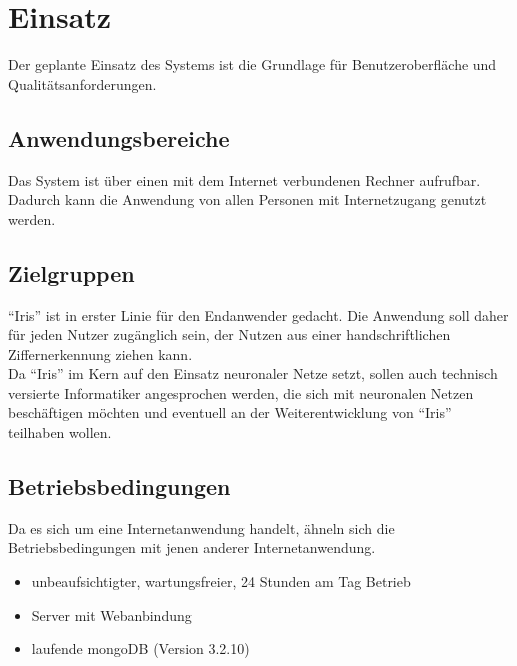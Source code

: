 \section{Einsatz}
Der geplante Einsatz des Systems ist die Grundlage für Benutzeroberfläche und
Qualitätsanforderungen.
 
\subsection{Anwendungsbereiche}

Das System ist über einen mit dem Internet verbundenen Rechner aufrufbar. Dadurch kann die Anwendung von allen Personen mit Internetzugang genutzt werden.

\subsection{Zielgruppen}

``Iris'' ist in erster Linie für den Endanwender gedacht. Die Anwendung soll daher für jeden Nutzer zugänglich sein, der Nutzen aus einer handschriftlichen Ziffernerkennung ziehen kann.\\
Da ``Iris'' im Kern auf den Einsatz neuronaler Netze setzt, sollen auch technisch versierte Informatiker angesprochen werden, die sich mit neuronalen Netzen beschäftigen möchten und eventuell an der Weiterentwicklung von ``Iris'' teilhaben wollen.

\subsection{Betriebsbedingungen}

Da es sich um eine Internetanwendung handelt, ähneln sich die Betriebsbedingungen mit jenen anderer Internetanwendung.

\begin{itemize}
	\item unbeaufsichtigter, wartungsfreier, 24 Stunden am Tag Betrieb\\[-0.9cm]
	\item Server mit Webanbindung \\[-0.9cm]
	\item laufende mongoDB (Version 3.2.10)
\end{itemize}
